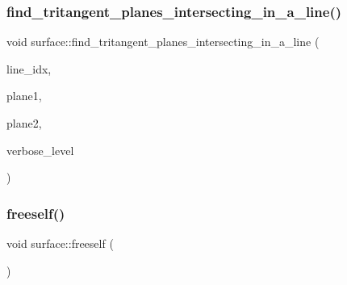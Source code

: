 \mbox{\label{classsurface_ac2ec562235cc6d25620aa5244bd32260}} 
\subsubsection{\texorpdfstring{find\+\_\+tritangent\+\_\+planes\+\_\+intersecting\+\_\+in\+\_\+a\+\_\+line()}{find\_tritangent\_planes\_intersecting\_in\_a\_line()}}
{\footnotesize\ttfamily void surface\+::find\+\_\+tritangent\+\_\+planes\+\_\+intersecting\+\_\+in\+\_\+a\+\_\+line (\begin{DoxyParamCaption}\item[{\mbox{\hyperlink{galois_8h_a09fddde158a3a20bd2dcadb609de11dc}{I\+NT}}}]{line\+\_\+idx,  }\item[{\mbox{\hyperlink{galois_8h_a09fddde158a3a20bd2dcadb609de11dc}{I\+NT}} \&}]{plane1,  }\item[{\mbox{\hyperlink{galois_8h_a09fddde158a3a20bd2dcadb609de11dc}{I\+NT}} \&}]{plane2,  }\item[{\mbox{\hyperlink{galois_8h_a09fddde158a3a20bd2dcadb609de11dc}{I\+NT}}}]{verbose\+\_\+level }\end{DoxyParamCaption})}

\mbox{\label{classsurface_a454920a44ae0760e82aa7f8a40268df3}} 
\subsubsection{\texorpdfstring{freeself()}{freeself()}}
{\footnotesize\ttfamily void surface\+::freeself (\begin{DoxyParamCaption}{ }\end{DoxyParamCaption})}

\mbox{\label{classsurface_a0fcc6b1b40c0be423e45efbef7ee52c6}} 
